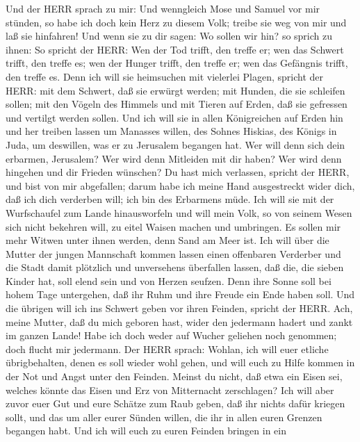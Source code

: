  Und der HERR sprach zu mir: Und wenngleich Mose und Samuel
vor mir stünden, so habe ich doch kein Herz zu diesem Volk; treibe sie
weg von mir und laß sie hinfahren!  Und wenn sie zu dir
sagen: Wo sollen wir hin? so sprich zu ihnen: So spricht der HERR: Wen
der Tod trifft, den treffe er; wen das Schwert trifft, den treffe es;
wen der Hunger trifft, den treffe er; wen das Gefängnis trifft, den
treffe es.  Denn ich will sie heimsuchen mit vielerlei
Plagen, spricht der HERR: mit dem Schwert, daß sie erwürgt werden; mit
Hunden, die sie schleifen sollen; mit den Vögeln des Himmels und mit
Tieren auf Erden, daß sie gefressen und vertilgt werden sollen.
 Und ich will sie in allen Königreichen auf Erden hin und
her treiben lassen um Manasses willen, des Sohnes Hiskias, des Königs in
Juda, um deswillen, was er zu Jerusalem begangen hat.  Wer
will denn sich dein erbarmen, Jerusalem? Wer wird denn Mitleiden mit dir
haben? Wer wird denn hingehen und dir Frieden wünschen?  Du
hast mich verlassen, spricht der HERR, und bist von mir abgefallen;
darum habe ich meine Hand ausgestreckt wider dich, daß ich dich
verderben will; ich bin des Erbarmens müde.  Ich will sie
mit der Wurfschaufel zum Lande hinausworfeln und will mein Volk, so von
seinem Wesen sich nicht bekehren will, zu eitel Waisen machen und
umbringen.  Es sollen mir mehr Witwen unter ihnen werden,
denn Sand am Meer ist. Ich will über die Mutter der jungen Mannschaft
kommen lassen einen offenbaren Verderber und die Stadt damit plötzlich
und unversehens überfallen lassen,  daß die, die sieben
Kinder hat, soll elend sein und von Herzen seufzen. Denn ihre Sonne soll
bei hohem Tage untergehen, daß ihr Ruhm und ihre Freude ein Ende haben
soll. Und die übrigen will ich ins Schwert geben vor ihren Feinden,
spricht der HERR.  Ach, meine Mutter, daß du mich geboren
hast, wider den jedermann hadert und zankt im ganzen Lande! Habe ich
doch weder auf Wucher geliehen noch genommen; doch flucht mir jedermann.
 Der HERR sprach: Wohlan, ich will euer etliche
übrigbehalten, denen es soll wieder wohl gehen, und will euch zu Hilfe
kommen in der Not und Angst unter den Feinden.  Meinst du
nicht, daß etwa ein Eisen sei, welches könnte das Eisen und Erz von
Mitternacht zerschlagen?  Ich will aber zuvor euer Gut und
eure Schätze zum Raub geben, daß ihr nichts dafür kriegen sollt, und das
um aller eurer Sünden willen, die ihr in allen euren Grenzen begangen
habt.  Und ich will euch zu euren Feinden bringen in ein
